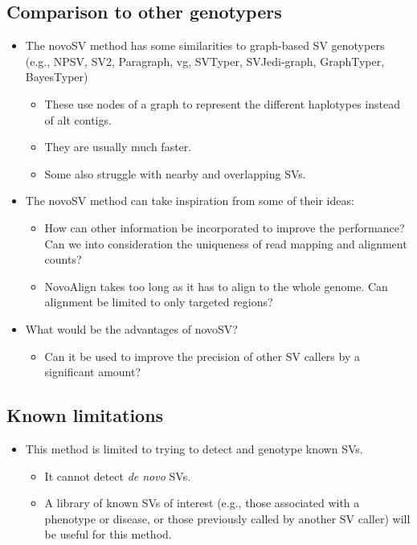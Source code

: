 \documentclass{article}
\begin{document}
%

\subsection{Comparison to other genotypers}

\begin{itemize}
\item The novoSV method has some similarities to graph-based SV genotypers (e.g., NPSV, SV2, Paragraph, vg, SVTyper, SVJedi-graph, GraphTyper, BayesTyper)\begin{itemize}
\item These use nodes of a graph to represent the different haplotypes instead of alt contigs.
\item They are usually much faster.
\item Some also struggle with nearby and overlapping SVs.
\end{itemize}


\item The novoSV method can take inspiration from some of their ideas:\begin{itemize}
\item How can other information be incorporated to improve the performance? Can we into consideration the uniqueness of read mapping and alignment counts?
\item NovoAlign takes too long as it has to align to the whole genome. Can alignment be limited to only targeted regions?
\end{itemize}


\item What would be the advantages of novoSV?\begin{itemize}
\item Can it be used to improve the precision of other SV callers by a significant amount?
\end{itemize}
\end{itemize}

\subsection{Known limitations}

\begin{itemize}
\item This method is limited to trying to detect and genotype known SVs.\begin{itemize}
\item It cannot detect \textit{de novo} SVs.
\item A library of known SVs of interest (e.g., those associated with a phenotype or disease, or those previously called by another SV caller) will be useful for this method.
\end{itemize}
\end{itemize}
\end{document}
